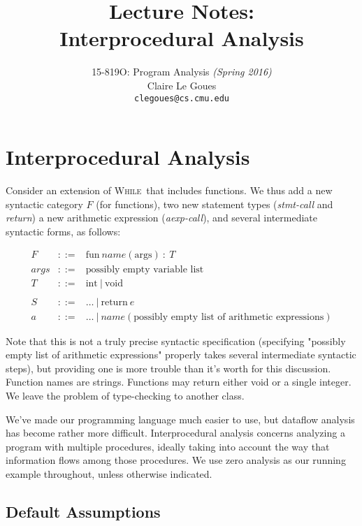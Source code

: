 \documentclass[11pt]{article}
\title{Lecture Notes:\\
		Interprocedural Analysis}
\author{15-819O: Program Analysis \emph{(Spring 2016)} \\
        Claire Le Goues \\
		{\tt clegoues@cs.cmu.edu}}
\date{}
\begin{document}
\newtheorem{theorem}{Theorem}
\newtheorem{lemma}[theorem]{Lemma}

\maketitle
\def\While{\textsc{While}}
\def\WhileThAddr{\textsc{While3Addr}}

\section{Interprocedural Analysis}

Consider an extension of \While\ that includes functions.  We thus add a new syntactic category $F$ (for functions), two new statement types (\textit{stmt-call} and \textit{return}) a new arithmetic expression (\textit{aexp-call}),  and several intermediate syntactic forms, as follows:

\[
\begin{array}{llllll}
F & ::= & \mbox{fun}~\textit{name} ( \mbox{args} )~:~T \\
args & ::= & \mbox{possibly empty variable list} \\
T & ::= & \mbox{int}~ |~ \mbox{void} \\
\\
S & ::= & \ldots~| ~\mbox{return}~e \\
a & ::= & \ldots~ |~ \textit{name}(\mbox{possibly empty list of arithmetic expressions} )
\end{array}
\]

Note that this is not a truly precise syntactic specification (specifying "possibly empty list of arithmetic expressions" properly takes several intermediate syntactic steps), but providing one is more trouble than it's worth for this discussion.  Function names are strings.  Functions may return either void or a single integer.  We leave the problem of type-checking to another class.

We've made our programming language much easier to use, but dataflow analysis has become rather more difficult.   Interprocedural analysis concerns analyzing a program with multiple procedures, ideally taking into account the way that information flows among those procedures.  We use zero analysis as our running example throughout, unless otherwise indicated.

\subsection{Default Assumptions}
\end{document}

